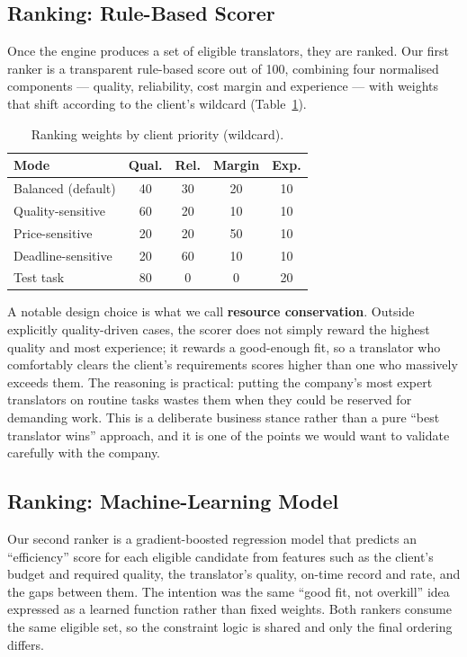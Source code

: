 \documentclass[9pt,a4paper,twoside]{utils/tau-class/tau}
\begin{document}
\subsection{Ranking: Rule-Based Scorer}

Once the engine produces a set of eligible translators, they are ranked. Our first ranker is a transparent rule-based score out of 100, combining four normalised components --- quality, reliability, cost margin and experience --- with weights that shift according to the client's wildcard (Table~\ref{tab:weights}).

\begin{table}[H]
    \centering
    \caption{Ranking weights by client priority (wildcard).}
    \label{tab:weights}
    \footnotesize
    \begin{tabular}{p{}cccc}
        \toprule
        \textbf{Mode} & \textbf{Qual.} & \textbf{Rel.} & \textbf{Margin} & \textbf{Exp.} \\
        \midrule
        Balanced (default) & 40 & 30 & 20 & 10 \\
        Quality-sensitive & 60 & 20 & 10 & 10 \\
        Price-sensitive & 20 & 20 & 50 & 10 \\
        Deadline-sensitive & 20 & 60 & 10 & 10 \\
        Test task & 80 & 0 & 0 & 20 \\
        \bottomrule
    \end{tabular}
\end{table}

A notable design choice is what we call \textbf{resource conservation}. Outside explicitly quality-driven cases, the scorer does not simply reward the highest quality and most experience; it rewards a good-enough fit, so a translator who comfortably clears the client's requirements scores higher than one who massively exceeds them. The reasoning is practical: putting the company's most expert translators on routine tasks wastes them when they could be reserved for demanding work. This is a deliberate business stance rather than a pure ``best translator wins'' approach, and it is one of the points we would want to validate carefully with the company.

\subsection{Ranking: Machine-Learning Model}

Our second ranker is a gradient-boosted regression model that predicts an ``efficiency'' score for each eligible candidate from features such as the client's budget and required quality, the translator's quality, on-time record and rate, and the gaps between them. The intention was the same ``good fit, not overkill'' idea expressed as a learned function rather than fixed weights. Both rankers consume the same eligible set, so the constraint logic is shared and only the final ordering differs.
\end{document}
